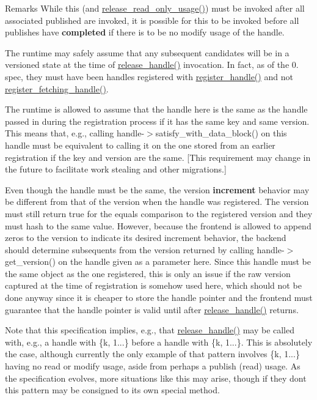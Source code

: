 \begin{DoxyRemark}{Remarks}
While this (and \hyperlink{classdarma__runtime_1_1abstract_1_1backend_1_1_runtime_a737e5704115b99df2ce2806b42ac76b1}{release\+\_\+read\+\_\+only\+\_\+usage()}) must be invoked after all associated published are invoked, it is possible for this to be invoked before all publishes have {\bfseries completed} if there is to be no modify usage of the handle.

The runtime may safely assume that any subsequent candidates will be in a versioned state at the time of \hyperlink{classdarma__runtime_1_1abstract_1_1backend_1_1_runtime_a54ba21615ed22638ea23a2a1f03fea02}{release\+\_\+handle()} invocation. In fact, as of the 0. spec, they must have been handles registered with \hyperlink{classdarma__runtime_1_1abstract_1_1backend_1_1_runtime_a8c70dc2b90fedd7ae6f090a19b3f694f}{register\+\_\+handle()} and not \hyperlink{classdarma__runtime_1_1abstract_1_1backend_1_1_runtime_acdb81206fe8a663754cf68f44731b35e}{register\+\_\+fetching\+\_\+handle()}.

The runtime is allowed to assume that the handle here is the same as the handle passed in during the registration process if it has the same key and same version. This means that, e.\+g., calling handle-\/$>$satisfy\+\_\+with\+\_\+data\+\_\+block() on this handle must be equivalent to calling it on the one stored from an earlier registration if the key and version are the same. \mbox{[}This requirement may change in the future to facilitate work stealing and other migrations.\mbox{]}

Even though the handle must be the same, the version {\bfseries increment} behavior may be different from that of the version when the handle was registered. The version must still return true for the equals comparison to the registered version and they must hash to the same value. However, because the frontend is allowed to append zeros to the version to indicate its desired increment behavior, the backend should determine subsequents from the version returned by calling handle-\/$>$get\+\_\+version() on the handle given as a parameter here. Since this handle must be the same object as the one registered, this is only an issue if the raw version captured at the time of registration is somehow used here, which should not be done anyway since it is cheaper to store the handle pointer and the frontend must guarantee that the handle pointer is valid until after \hyperlink{classdarma__runtime_1_1abstract_1_1backend_1_1_runtime_a54ba21615ed22638ea23a2a1f03fea02}{release\+\_\+handle()} returns.

Note that this specification implies, e.\+g., that \hyperlink{classdarma__runtime_1_1abstract_1_1backend_1_1_runtime_a54ba21615ed22638ea23a2a1f03fea02}{release\+\_\+handle()} may be called with, e.\+g., a handle with \{k, 1...\} before a handle with \{k, 1...\}. This is absolutely the case, although currently the only example of that pattern involves \{k, 1...\} having no read or modify usage, aside from perhaps a publish (read) usage. As the specification evolves, more situations like this may arise, though if they don\textquotesingle{}t this pattern may be consigned to its own special method.
\end{DoxyRemark}


